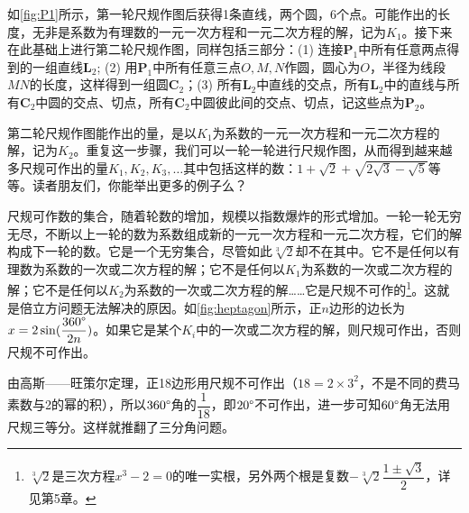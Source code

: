 \documentclass[b5paper]{ctexart}
\begin{document}
如\cref{fig:P1}所示，第一轮尺规作图后获得1条直线，两个圆，6个点。可能作出的长度，无非是系数为有理数的一元一次方程和一元二次方程的解，记为$K_1$。接下来在此基础上进行第二轮尺规作图，同样包括三部分：(1) 连接$\mathbf{P}_1$中所有任意两点得到的一组直线$\mathbf{L}_2$; (2) 用$\mathbf{P}_1$中所有任意三点$O, M, N$作圆，圆心为$O$，半径为线段$MN$的长度，这样得到一组圆$\mathbf{C}_2$；(3) 所有$\mathbf{L}_2$中直线的交点，所有$\mathbf{L}_2$中的直线与所有$\mathbf{C}_2$中圆的交点、切点，所有$\mathbf{C}_2$中圆彼此间的交点、切点，记这些点为$\mathbf{P}_2$。

第二轮尺规作图能作出的量，是以$K_1$为系数的一元一次方程和一元二次方程的解，记为$K_2$。重复这一步骤，我们可以一轮一轮进行尺规作图，从而得到越来越多尺规可作出的量$K_1, K_2, K_3, \dotsc$其中包括这样的数：$1 + \sqrt{2} + \sqrt{2\sqrt{3} - \sqrt{5}}$等等。读者朋友们，你能举出更多的例子么？

尺规可作数的集合，随着轮数的增加，规模以指数爆炸的形式增加。一轮一轮无穷无尽，不断以上一轮的数为系数组成新的一元一次方程和一元二次方程，它们的解构成下一轮的数。它是一个无穷集合，尽管如此$\sqrt[3]{2}$却不在其中。它不是任何以有理数为系数的一次或二次方程的解；它不是任何以$K_1$为系数的一次或二次方程的解；它不是任何以$K_2$为系数的一次或二次方程的解……它是尺规不可作的\footnote{$\sqrt[3]{2}$是三次方程$x^3 - 2 = 0$的唯一实根，另外两个根是复数$-\sqrt[3]{2}\dfrac{1 \pm \sqrt{3}}{2}$，详见第5章。}。这就是倍立方问题无法解决的原因。如\cref{fig:heptagon}所示，正$n$边形的边长为$x = 2\sin(\dfrac{360\degree}{2n})$。如果它是某个$K_i$中的一次或二次方程的解，则尺规可作出，否则尺规不可作出。

由高斯——旺策尔定理，正18边形用尺规不可作出（$18 = 2 \times 3^2$，不是不同的费马素数与2的幂的积），所以$360\degree$角的$\dfrac{1}{18}$，即$20\degree$不可作出，进一步可知$60\degree$角无法用尺规三等分。这样就推翻了三分角问题。
\end{document}
